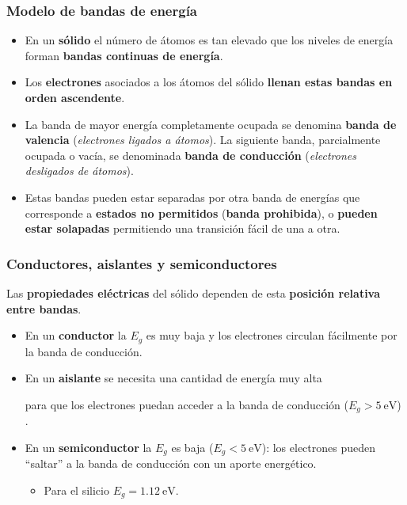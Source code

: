 \documentclass[xcolor=dvipsnames]{beamer}
\begin{document}
\begin{frame}
  \frametitle{Modelo de bandas de energía}

  \begin{itemize}
  \item En un \textbf{sólido} el número de átomos es tan elevado que
    los niveles de energía forman \textbf{bandas continuas de
      energía}.
  \item Los \textbf{electrones} asociados a los átomos del sólido
    \textbf{llenan estas bandas en orden ascendente}.
  \item La banda de mayor energía completamente ocupada se denomina
    \textbf{banda de valencia} (\emph{electrones ligados a
      átomos}). La siguiente banda, parcialmente ocupada o vacía, se
    denominada \textbf{banda de conducción} (\emph{electrones
      desligados de átomos}).
  \item Estas bandas pueden estar separadas por otra banda de energías
    que corresponde a \textbf{estados no permitidos} (\textbf{banda
      prohibida}), o \textbf{pueden estar solapadas} permitiendo una
    transición fácil de una a otra.
  \end{itemize}

\end{frame}

\begin{frame}
  \frametitle{Conductores, aislantes y semiconductores}

  Las \textbf{propiedades eléctricas} del sólido dependen de esta
  \textbf{posición relativa entre bandas}.

  \begin{itemize}

  \item En un \textbf{conductor} la $E_{g}$ es muy baja y los
    electrones circulan fácilmente por la banda de conducción.
  \item En un \textbf{aislante} se necesita una cantidad de energía
    muy alta

    para que los electrones puedan acceder a la banda de conducción
    ($E_{g}>\SI{5}{\electronvolt}$) .
  \item En un \textbf{semiconductor} la $E_{g}$ es baja
    ($E_{g}<\SI{5}{\electronvolt}$): los electrones pueden
    {}``saltar'' a la banda de conducción con un aporte energético.

    \begin{itemize}
    \item Para el silicio $E_{g}=\SI{1.12}{\electronvolt}$.
    \end{itemize}

  \end{itemize}

\end{frame}
\end{document}
